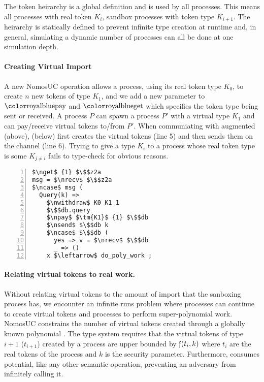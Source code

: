 The token heirarchy is a global definition and is used by all processes. 
This means all processes with real token $K_i$, sandbox processes with token type $K_{i+1}$.
The heirarchy is statically defined to prevent infinite type creation at runtime and, in general, simulating a dynamic number of processes can all be done at one simulation depth. 

\paragraph{Creating Virtual Import}
A new NomosUC operation  allows a process, using its real token type $K_0$, to create $n$ new tokens of type $K_1$, and we add a new parameter to $\npay$ and $\nget$ which specifies the token type being sent or received. 
A process $P$ can spawn a process $P'$ with a virtual type $K_1$ and can pay/receive virtual tokens to/from $P'$.
When communiating with augmented \Fdb (above), \Sim (below) first creates the virtual tokens (line 5) and then sends them on the channel (line 6).
Trying to give a type $K_i$ to a process whose real token type is some $K_{j \neq i}$ fails to type-check for obvious reasons.
\begin{lstlisting}[basicstyle=\scriptsize\BeraMonottFamily, frame=single, mathescape, numbers=left, xleftmargin=2em, xrightmargin=2em]
$\nget$ {1} $\$$z2a
msg = $\nrecv$ $\$$z2a
$\ncase$ msg (
  Query(k) => 
    $\nwithdraw$ K0 K1 1
    $\$$db.query
    $\npay$ $\tm{K1}$ {1} $\$$db
    $\nsend$ $\$$db k
    $\ncase$ $\$$db (
      yes => v = $\nrecv$ $\$$db 
      _ => ()
    x $\leftarrow$ do_poly_work ;
\end{lstlisting}

\paragraph{Relating virtual tokens to real work.}
Without relating virtual tokens to the amount of import that the sanboxing process has, we encounter an infinite runs problem where processes can continue to create virtual tokens and processes to perform super-polynomial work.
NomosUC constrains the number of virtual tokens created through a globally known polynomial \GlobalF.
The type system requires that the virtual tokens of type $i+1$ ($t_{i+1}$) created by a process are upper bounded by $\mathfrak{f}(t_i, k)$ where $t_i$ are the real tokens of the process and $k$ is the security parameter. 
Furthermore, \inline{$\nwithdraw$} consumes potential, like any other semantic operation, preventing an adversary from infinitely calling it.

